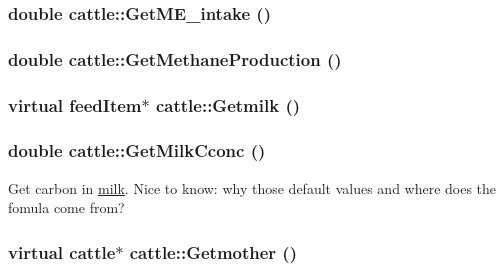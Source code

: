 \label{classcattle_a8211a2fdbecf994a39ab695be7a2bfb0}
\hypertarget{classcattle_ac5a17c14e1bbb07428588e7638eee47f}{
\subsubsection[{GetME\_\-intake}]{\setlength{\rightskip}{0pt plus 5cm}double cattle::GetME\_\-intake ()}}
\label{classcattle_ac5a17c14e1bbb07428588e7638eee47f}
\hypertarget{classcattle_a8053c5118595709cf95a6e54b2560024}{
\subsubsection[{GetMethaneProduction}]{\setlength{\rightskip}{0pt plus 5cm}double cattle::GetMethaneProduction ()}}
\label{classcattle_a8053c5118595709cf95a6e54b2560024}
\hypertarget{classcattle_a0e993d2a22fd76bb0d1adfb0164eb5d8}{
\subsubsection[{Getmilk}]{\setlength{\rightskip}{0pt plus 5cm}virtual {\bf feedItem}$\ast$ cattle::Getmilk ()}}
\label{classcattle_a0e993d2a22fd76bb0d1adfb0164eb5d8}
\hypertarget{classcattle_a6301f605944f6071be0c63421353c375}{
\subsubsection[{GetMilkCconc}]{\setlength{\rightskip}{0pt plus 5cm}double cattle::GetMilkCconc ()}}
\label{classcattle_a6301f605944f6071be0c63421353c375}
Get carbon in \hyperlink{classmilk}{milk}. Nice to know: why those default values and where does the fomula come from? \hypertarget{classcattle_acc71b376de54129fb52a75aa17476cb0}{
\subsubsection[{Getmother}]{\setlength{\rightskip}{0pt plus 5cm}virtual {\bf cattle}$\ast$ cattle::Getmother ()}}
